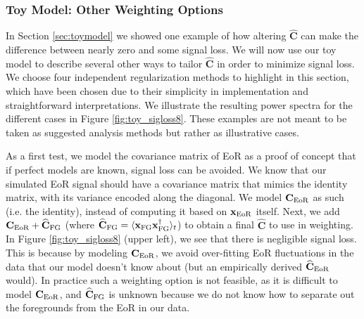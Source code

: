 \documentclass[preprint2,numberedappendix,tighten]{aastex6}  %
\begin{document}
\subsubsection{Toy Model: Other Weighting Options}
\label{sec:otherweight}

In Section \ref{sec:toymodel} we showed one example of how altering $\widehat{\textbf{C}}$ can 
make the difference between nearly zero and some signal loss. We will now use our toy model to describe several other ways to tailor $\widehat{\textbf{C}}$ 
in order to minimize signal loss. We choose four independent regularization methods to highlight in this section, which have 
been chosen due to their simplicity in implementation and straightforward interpretations. We illustrate the resulting power 
spectra for the different cases in Figure \ref{fig:toy_sigloss8}.
These examples are not meant to be taken as suggested analysis methods but rather as illustrative cases. 

As a first test, we model the covariance matrix of EoR as a proof of concept that if perfect models are known, signal loss can be 
avoided. We know that our simulated EoR signal should have a covariance matrix that mimics the identity matrix, with its 
variance encoded along the diagonal. We model $\textbf{C}_{\rm EoR}$ as such (i.e. the identity), instead of computing it based on $\textbf{x}
_{\rm EoR}$ itself. Next, we add $\textbf{C}_{\rm EoR} + \widehat{\textbf{C}}_{\rm FG}$ (where $\widehat{\textbf{C}}_{\rm FG} = \langle\textbf{x}_{\rm FG}
\textbf{x}_{\rm FG}^{\dagger}\rangle_{t}$) to obtain a final $\widehat{\textbf{C}}$ to use in weighting. In Figure \ref{fig:toy_sigloss8} (upper 
left), we see that there is negligible signal loss. This is because by modeling $\textbf{C}_{\rm EoR}$, we avoid over-fitting EoR fluctuations in the data that our model doesn't know about (but an empirically derived $\widehat{\textbf{C}}_{\rm EoR}$ would). 
In practice such a weighting option is not feasible, as it is difficult to model $\textbf{C}_{\rm EoR}$, and $\widehat{\textbf{C}}_{\rm FG}$ is unknown because we do not know how to separate out the foregrounds from the EoR in our data.
\end{document}

